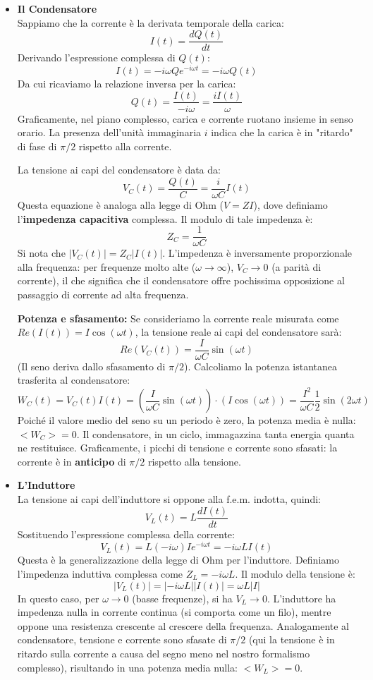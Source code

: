 \documentclass{book}
\begin{document}
\begin{itemize}
  \item \textbf{Il Condensatore} \\
  Sappiamo che la corrente è la derivata temporale della carica:
  $$ I(t) = \frac{dQ(t)}{dt} $$
  Derivando l'espressione complessa di $Q(t)$:
  $$ I(t) = -i\omega Q e^{-i\omega t} = -i\omega Q(t) $$
  Da cui ricaviamo la relazione inversa per la carica:
  $$ Q(t) = \frac{I(t)}{-i\omega} = \frac{i I(t)}{\omega} $$
  Graficamente, nel piano complesso, carica e corrente ruotano insieme in senso orario. La presenza dell'unità immaginaria $i$ indica che la carica è in "ritardo" di fase di $\pi/2$ rispetto alla corrente.

  La tensione ai capi del condensatore è data da:
  $$ V_C(t)= \frac{Q(t)}{C} = \frac{i}{\omega C} I(t) $$
  Questa equazione è analoga alla legge di Ohm ($V=ZI$), dove definiamo l'\textbf{impedenza capacitiva} complessa. Il modulo di tale impedenza è:
  $$ Z_C = \frac{1}{\omega C} $$
  Si nota che $|V_C(t)| = Z_C |I(t)|$. L'impedenza è inversamente proporzionale alla frequenza: per frequenze molto alte ($\omega \to \infty$), $V_C \to 0$ (a parità di corrente), il che significa che il condensatore offre pochissima opposizione al passaggio di corrente ad alta frequenza.

  \textbf{Potenza e sfasamento:}
  Se consideriamo la corrente reale misurata come $Re(I(t))= I \cos(\omega t)$, la tensione reale ai capi del condensatore sarà:
  $$ Re(V_C(t))= \frac{I}{\omega C} \sin (\omega t) $$
  (Il seno deriva dallo sfasamento di $\pi/2$).
  Calcoliamo la potenza istantanea trasferita al condensatore:
  $$ W_C(t)= V_C(t)I(t) = \left( \frac{I}{\omega C} \sin(\omega t) \right) \cdot ( I \cos(\omega t) ) = \frac{I^2}{\omega C} \frac{1}{2} \sin (2\omega t) $$
  Poiché il valore medio del seno su un periodo è zero, la potenza media è nulla: $<W_C> = 0$. Il condensatore, in un ciclo, immagazzina tanta energia quanta ne restituisce.
  Graficamente, i picchi di tensione e corrente sono sfasati: la corrente è in \textbf{anticipo} di $\pi/2$ rispetto alla tensione.

  \item \textbf{L'Induttore} \\
  La tensione ai capi dell'induttore si oppone alla f.e.m. indotta, quindi:
  $$ V_L(t) = L\frac{dI(t)}{dt} $$
  Sostituendo l'espressione complessa della corrente:
  $$ V_L(t) = L (-i\omega) I e^{-i\omega t} = -i\omega L I(t) $$
  Questa è la generalizzazione della legge di Ohm per l'induttore. Definiamo l'impedenza induttiva complessa come $Z_L = -i\omega L$.
  Il modulo della tensione è:
  $$ |V_L(t)| = |-i\omega L| |I(t)| = \omega L |I| $$
  In questo caso, per $\omega \to 0$ (basse frequenze), si ha $V_L \to 0$. L'induttore ha impedenza nulla in corrente continua (si comporta come un filo), mentre oppone una resistenza crescente al crescere della frequenza.
  Analogamente al condensatore, tensione e corrente sono sfasate di $\pi/2$ (qui la tensione è in ritardo sulla corrente a causa del segno meno nel nostro formalismo complesso), risultando in una potenza media nulla: $<W_L>=0$.


\end{itemize}
\end{document}

